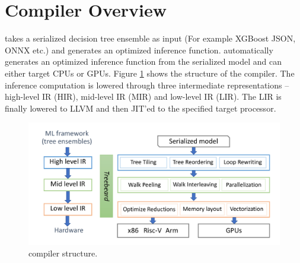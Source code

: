 \section{Compiler Overview}
\label{Sec:Overview}
\Treebeard{} takes a serialized decision tree ensemble as input (For example
XGBoost JSON, ONNX etc.) and generates an optimized inference function. 
\Treebeard{} automatically generates an optimized inference function from 
the serialized model and can either target CPUs or GPUs. 
Figure \ref{Fig:CompilerStructure} shows the structure of the \Treebeard{} compiler. 
The inference computation is lowered through three intermediate representations
-- high-level IR (HIR), mid-level IR (MIR) and low-level IR (LIR). The LIR is
finally lowered to LLVM and then JIT'ed to the specified target processor.

\begin{figure}[htb]
  \centering
  \includegraphics[width=\linewidth]{figures/compiler.png}
  \caption{\Treebeard{} compiler structure.}
  \label{Fig:CompilerStructure}
\end{figure}

